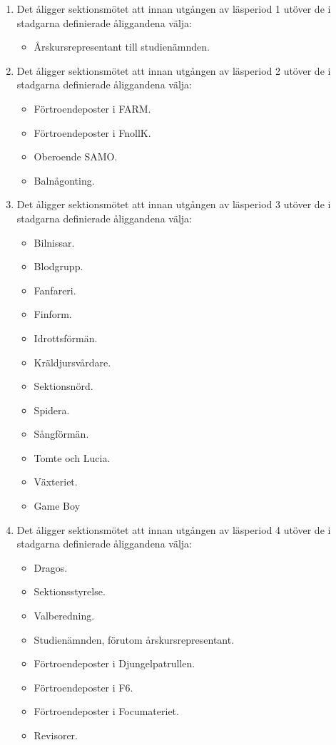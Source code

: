 \documentclass[11pt,a4paper]{article}
\begin{document}
\begin{enumerate}[\thesubsection .1]

  \item Det åligger sektionsmötet att innan utgången av läsperiod 1
  utöver de i stadgarna definierade åliggandena välja:
    \begin{itemize}
      \item Årskursrepresentant  till studienämnden.
    \end{itemize}

  \item Det åligger sektionsmötet att innan utgången av läsperiod 2
    utöver de i stadgarna definierade åliggandena välja:
    \begin{itemize}
      \item Förtroendeposter i FARM.
      \item Förtroendeposter i FnollK.
      \item Oberoende SAMO.
      \item Balnågonting.
    \end{itemize}

  \item Det åligger sektionsmötet att innan utgången av  läsperiod 3
    utöver de i stadgarna definierade åliggandena välja:
    \begin{itemize}
      \item Bilnissar.
      \item Blodgrupp.
      \item Fanfareri.
      \item Finform.
      \item Idrottsförmän.
      \item Kräldjursvårdare.
      \item Sektionsnörd.
      \item Spidera.
      \item Sångförmän.
      \item Tomte och Lucia.
      \item Växteriet.
      \item Game Boy
    \end{itemize}

  \item Det åligger sektionsmötet att innan utgången av  läsperiod 4
    utöver de i stadgarna definierade åliggandena välja:
    \begin{itemize}
      \item Dragos.
      \item Sektionsstyrelse.
      \item Valberedning.
      \item Studienämnden, förutom årskursrepresentant.
      \item Förtroendeposter i Djungelpatrullen.
      \item Förtroendeposter i F6.
      \item Förtroendeposter i Focumateriet.
       \item Revisorer.
    \end{itemize}

\end{enumerate}
\end{document}
